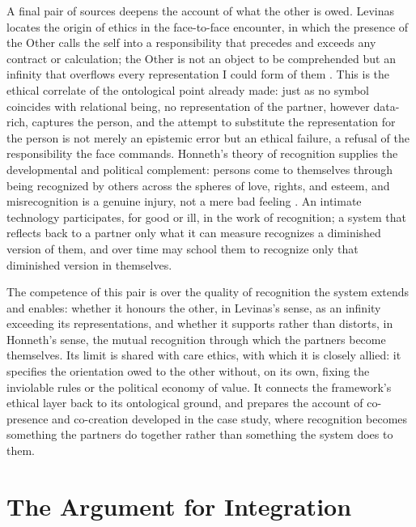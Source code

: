 A final pair of sources deepens the account of what the other is owed. Levinas locates the origin of ethics in the face-to-face encounter, in which the presence of the Other calls the self into a responsibility that precedes and exceeds any contract or calculation; the Other is not an object to be comprehended but an infinity that overflows every representation I could form of them \parencite{levinas1969totality}. This is the ethical correlate of the ontological point already made: just as no symbol coincides with relational being, no representation of the partner, however data-rich, captures the person, and the attempt to substitute the representation for the person is not merely an epistemic error but an ethical failure, a refusal of the responsibility the face commands. Honneth's theory of recognition supplies the developmental and political complement: persons come to themselves through being recognized by others across the spheres of love, rights, and esteem, and misrecognition is a genuine injury, not a mere bad feeling \parencite{honneth1995struggle}. An intimate technology participates, for good or ill, in the work of recognition; a system that reflects back to a partner only what it can measure recognizes a diminished version of them, and over time may school them to recognize only that diminished version in themselves.

The competence of this pair is over the quality of recognition the system extends and enables: whether it honours the other, in Levinas's sense, as an infinity exceeding its representations, and whether it supports rather than distorts, in Honneth's sense, the mutual recognition through which the partners become themselves. Its limit is shared with care ethics, with which it is closely allied: it specifies the orientation owed to the other without, on its own, fixing the inviolable rules or the political economy of value. It connects the framework's ethical layer back to its ontological ground, and prepares the account of co-presence and co-creation developed in the case study, where recognition becomes something the partners do together rather than something the system does to them.

\section{The Argument for Integration}\label{p01:sec:integration-argument}

